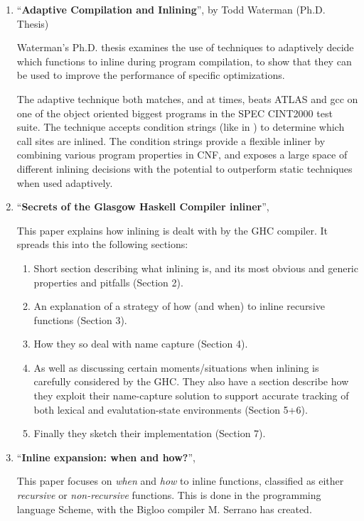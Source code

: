 \begin{enumerate}

	\item ``\textbf{Adaptive Compilation and Inlining}'', by Todd
Waterman (Ph.D. Thesis)

Waterman's Ph.D. thesis \cite{AdaptvCompilAndInlingWaterman} examines the use of
techniques to adaptively decide which functions to inline during program
compilation, to show that they can be used to improve the performance of
specific optimizations.

The adaptive technique both matches, and at times, beats ATLAS  and gcc on one of the object oriented biggest programs in the SPEC
CINT2000 test suite. The technique accepts condition strings (like in
\cite{AutoTuningJavaHeuristics}) to determine which call sites are inlined. The
condition strings provide a flexible inliner by combining various program
properties in CNF, and exposes a large space of different inlining decisions
with the potential to outperform static techniques when used adaptively.

	\item ``\textbf{Secrets of the Glasgow Haskell Compiler inliner}'',
\cite{GHC-paper}

This paper explains how inlining is dealt with by the GHC compiler. It spreads
this into the following sections:
\begin{enumerate}
	\item Short section describing what inlining is, and its most obvious and
generic properties and pitfalls (Section 2).
	\item An explanation of a strategy of how (and when) to inline recursive
functions (Section 3).
	\item How they so deal with name capture (Section 4).
	\item As well as discussing certain moments/situations when inlining is
carefully considered by the GHC. They also have a section describe how they
exploit their name-capture solution to support accurate tracking of both lexical
and evalutation-state environments (Section 5+6).
	\item Finally they sketch their implementation (Section 7).
\end{enumerate}

	\item ``\textbf{Inline expansion: when and how?}'',
\cite{InlineWhenHowSerrano}

This paper focuses on \textit{when} and \textit{how} to inline functions,
classified as either \textit{recursive} or \textit{non-recursive} functions.
This is done in the programming language Scheme, with the
Bigloo compiler M. Serrano has created.


\end{enumerate}
